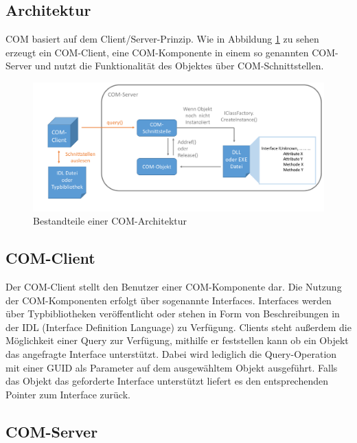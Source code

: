 \subsection{Architektur}
\label{ch:grundlagen:sec:ComponentObjectModel:subsec:Architektur}

COM basiert auf dem Client/Server-Prinzip. Wie in Abbildung \ref{GL_COM} zu sehen erzeugt ein COM-Client, eine COM-Komponente in einem so genannten COM-Server und nutzt die Funktionalität des Objektes über COM-Schnittstellen. 

\begin{figure}[H]
	\centering
  \includegraphics[width=1.0\textwidth, width=1.0\textwidth]{pics/Grundlagen_com.pdf}
	\caption{Bestandteile einer COM-Architektur}
	\label{GL_COM}
\end{figure} 

\subsection{COM-Client}
\label{ch:grundlagen:sec:ComponentObjectModel:subsec:COMClient}

Der COM-Client stellt den Benutzer einer COM-Komponente dar. Die Nutzung der COM-Komponenten erfolgt über sogenannte Interfaces. Interfaces werden über Typbibliotheken veröffentlicht oder stehen in Form von Beschreibungen in der IDL (Interface Definition Language) zu Verfügung. Clients steht außerdem die Möglichkeit einer Query zur Verfügung, mithilfe er feststellen kann ob ein Objekt das angefragte Interface unterstützt. Dabei wird lediglich die Query-Operation mit einer GUID als Parameter auf dem ausgewähltem Objekt ausgeführt. Falls das Objekt das geforderte Interface unterstützt liefert es den entsprechenden Pointer zum Interface zurück.  

\subsection{COM-Server}
\label{ch:grundlagen:sec:ComponentObjectModel:subsec:COMServer}

